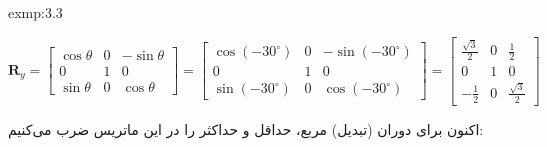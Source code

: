 {\begin{spacing}{1.5}
\begin{exmp}{exmp:3.3}
            \begin{center}
                $\textbf{R}_{y}=\begin{bmatrix}
                                    \cos\theta & 0 & -\sin\theta \\
                                    0          & 1 & 0           \\
                                    \sin\theta & 0 & \cos\theta
                \end{bmatrix}=\begin{bmatrix}
                                  \cos(-30^\circ) & 0 & -\sin(-30^\circ) \\
                                  0               & 1 & 0                \\
                                  \sin(-30^\circ) & 0 & \cos(-30^\circ)
                \end{bmatrix}=\begin{bmatrix}
                                  \frac{\displaystyle \sqrt{\displaystyle 3}}{\displaystyle 2} & 0 & \frac{\displaystyle 1}{\displaystyle 2}                      \\
                                  0                                                            & 1 & 0                                                            \\
                                  -\frac{\displaystyle 1}{\displaystyle 2}                     & 0 & \frac{\displaystyle \sqrt{\displaystyle 3}}{\displaystyle 2}
                \end{bmatrix}$
            \end{center}

            اکنون برای دوران (تبدیل) مربع، حداقل و حداکثر را در این ماتریس ضرب می‌کنیم:


\end{exmp}
\end{spacing}}
